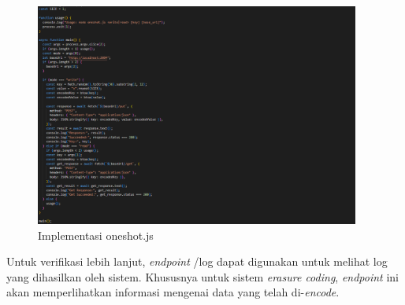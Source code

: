 \begin{figure}[ht]
    \centering
    \includegraphics[width=0.95\textwidth]{resources/chapter-4/oneshot.png}
    \caption{Implementasi oneshot.js}
    \label{fig:implementasi-oneshot}
\end{figure}

Untuk verifikasi lebih lanjut, \textit{endpoint} /log dapat digunakan untuk melihat log yang dihasilkan oleh sistem. Khususnya untuk sistem \textit{erasure coding}, \textit{endpoint} ini akan memperlihatkan informasi mengenai data yang telah di-\textit{encode}.